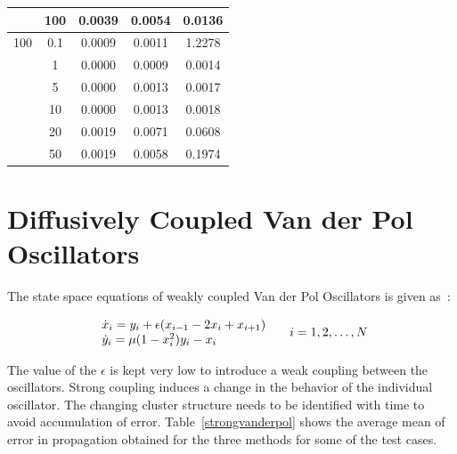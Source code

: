 \begin{table}[H]
\begin{center}
{\begin{tabular}{|c|c|c|c|c|}
    &    100    &    0.0039    &    0.0054    &    0.0136    \\ \hline
100    &    0.1    &    0.0009    &    0.0011    &    1.2278    \\ \hline
    &    1    &    0.0000    &    0.0009    &    0.0014    \\ \hline
    &    5    &    0.0000    &    0.0013    &    0.0017    \\ \hline
    &    10    &    0.0000    &    0.0013    &    0.0018    \\ \hline
    &    20    &    0.0019    &    0.0071    &    0.0608    \\ \hline
    &    50    &    0.0019    &    0.0058    &    0.1974    \\ \hline
\end{tabular} 
}
\end{center}
\end{table}

\section{Diffusively Coupled Van der Pol Oscillators}
The state space equations of weakly coupled Van der Pol Oscillators is given as~\cite{van1920theory}:

\begin{equation}
\label{strong_vanderpol}
\begin{array}{l}
\dot{x}_i = y_i + \epsilon (x_{i-1} - 2x_i + x_{i+1}) \\
\dot{y}_i = \mu(1-x_i^2)y_i - x_i  
\end{array}\hspace{5 mm} i = 1,2,\ldots,N
\end{equation}

The value of the $\epsilon$ is kept very low to introduce a weak coupling between the oscillators. Strong coupling induces a change in the behavior of the individual oscillator. The changing cluster structure needs to be identified with time to avoid accumulation of error. Table~\ref{strongvanderpol} shows the average mean of error in propagation obtained for the three methods for some of the test cases.

